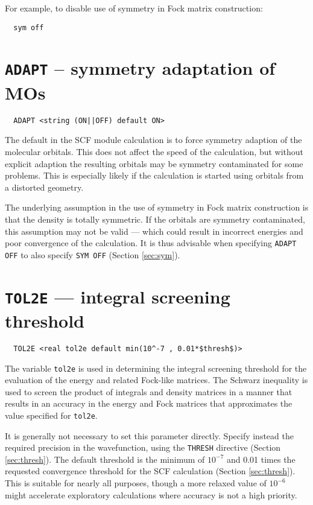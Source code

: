 For example, to disable use of symmetry in Fock matrix construction:
\begin{verbatim}
  sym off
\end{verbatim}

\section{{\tt ADAPT} -- symmetry adaptation of MOs}
\label{sec:adapt}

\begin{verbatim}
  ADAPT <string (ON||OFF) default ON>
\end{verbatim}

The default in the SCF module calculation is to force symmetry
adaption of the molecular orbitals. This does not affect the speed of
the calculation, but without explicit adaption the resulting orbitals
may be symmetry contaminated for some problems.  This is especially
likely if the calculation is started using orbitals from a distorted
geometry.

The underlying assumption in the use of symmetry in Fock matrix
construction is that the density is totally symmetric.  If the orbitals
are symmetry contaminated, this assumption may not be valid --- which
could result in incorrect energies and poor convergence of the
calculation.  It is thus advisable when specifying \verb+ADAPT OFF+ to
also specify \verb+SYM OFF+ (Section \ref{sec:sym}).

\section{{\tt TOL2E} --- integral screening threshold}
\label{sec:tol2e}

\begin{verbatim}
  TOL2E <real tol2e default min(10^-7 , 0.01*$thresh$)>
\end{verbatim}

The variable \verb+tol2e+ is used in determining the integral
screening threshold for the evaluation of the energy and related
Fock-like matrices.  The Schwarz inequality is used to screen the
product of integrals and density matrices in a manner that results in
an accuracy in the energy and Fock matrices that approximates the
value specified for \verb+tol2e+. 

It is generally not necessary to set this parameter directly.  Specify
instead the required precision in the wavefunction, using the
\verb+THRESH+ directive (Section \ref{sec:thresh}). The default
threshold is the minimum of $10^{-7}$ and 0.01 times the requested
convergence threshold for the SCF calculation (Section
\ref{sec:thresh}).  This is suitable for nearly all purposes, though a
more relaxed value of $10^{-6}$ might accelerate exploratory
calculations where accuracy is not a high priority.

